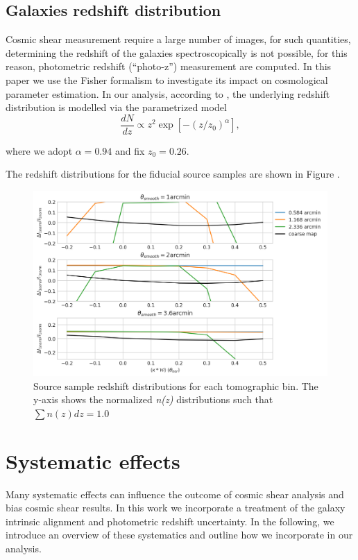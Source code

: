 \documentclass[twocolumn,twocolappendix]{aastex63}
\begin{document}
\subsection{Galaxies redshift distribution}
Cosmic shear measurement require a large number of images, for such quantities, determining the redshift of the galaxies spectroscopically is not possible, for this reason, photometric redshift (``photo-z'') measurement are computed.
In this paper we use the Fisher formalism to investigate its impact on cosmological parameter estimation.
In our analysis, according to \cite{zhang2021transitioning}, the underlying redshift distribution is modelled via the parametrized model
\begin{equation}\label{photz}
    \frac{dN}{dz} \propto z^{2} \exp{[-(z/z_0)^{\alpha}]},
\end{equation}

where we adopt $\alpha=0.94$ and fix $z_0=0.26$.  

The redshift distributions for the fiducial source samples are shown in Figure . 
\begin{figure}\label{photoz}
    \centering
    \includegraphics[width=\columnwidth]{paper/figures/l1normktng_compallarc.png}
    \caption{
   Source sample redshift distributions for each tomographic bin. The y-axis shows the normalized \textit{n(z)} distributions such that $\sum n(z)dz=1.0$}
    \label{fig:l1normktng_compallarc}
\end{figure}




\section{Systematic effects}
Many systematic effects can influence the outcome of cosmic shear analysis and bias cosmic shear results. 
In this work we incorporate a treatment of the galaxy intrinsic alignment and photometric redshift uncertainty.
In the following, we introduce an overview of these systematics and outline how we incorporate in our analysis.
\end{document}
